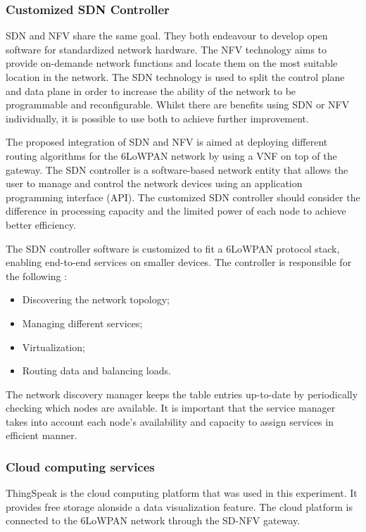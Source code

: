 \documentclass[10pt,journal,compsoc]{IEEEtran}
\begin{document}
\subsubsection{Customized SDN Controller}

SDN and NFV share the same goal. They both endeavour to develop open 
software for standardized network hardware. The NFV technology aims to 
provide on-demande network functions and locate them on the most 
suitable location in the network. The SDN technology is used to split 
the control plane and data plane in order to increase the ability of 
the network to be programmable and reconfigurable. Whilst there are 
benefits using SDN or NFV individually, it is possible to use both to 
achieve further improvement. 

The proposed integration of SDN and NFV is aimed at deploying different 
routing algorithms for the 6LoWPAN network by using a VNF on top of 
the gateway. The SDN controller is a software-based network entity 
that allows the user to manage and control the network devices using 
an application programming interface (API). The customized SDN controller 
should consider the difference in processing capacity and the limited 
power of each node to achieve better efficiency. 

The SDN controller software is customized to fit a 6LoWPAN protocol stack, 
enabling end-to-end services on smaller devices. The controller is 
responsible for the following :

\begin{itemize}
    \item Discovering the network topology;
    \item Managing different services;
    \item Virtualization;
    \item Routing data and balancing loads.
\end{itemize}

The network discovery manager keeps the table entries up-to-date 
by periodically checking which nodes are available. It is important that 
the service manager takes into account each node's availability and 
capacity to assign services in efficient manner.

\subsubsection{Cloud computing services}

ThingSpeak is the cloud computing platform that was used in this 
experiment. It provides free storage alonside a data visualization 
feature. The cloud platform is connected to the 6LoWPAN network through 
the SD-NFV gateway. 
\end{document}
